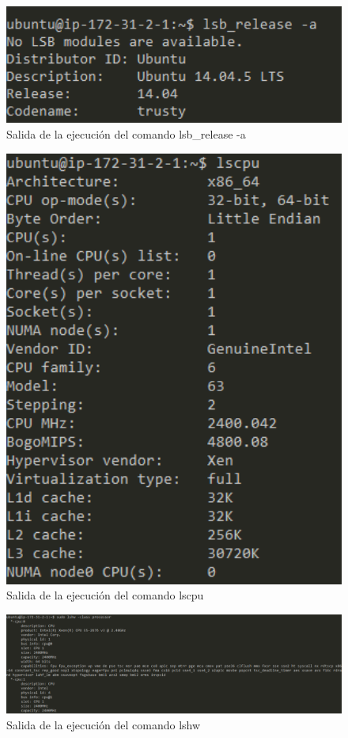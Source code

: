 \begin{figure}[H]
   \centering
   \includegraphics[width=12cm]{img/lsb_release}
   \caption{Salida de la ejecución del comando lsb\_release -a}
   \label{figura:lsb_release}
\end{figure}
\begin{figure}[H]
   \centering
   \includegraphics[width=12cm]{img/lscpu}
   \caption{Salida de la ejecución del comando lscpu}
   \label{figura:lscpu}
\end{figure}
\begin{figure}[H]
   \centering
   \includegraphics[width=12cm]{img/lshw}
   \caption{Salida de la ejecución del comando lshw}
   \label{figura:lshw}
\end{figure}
